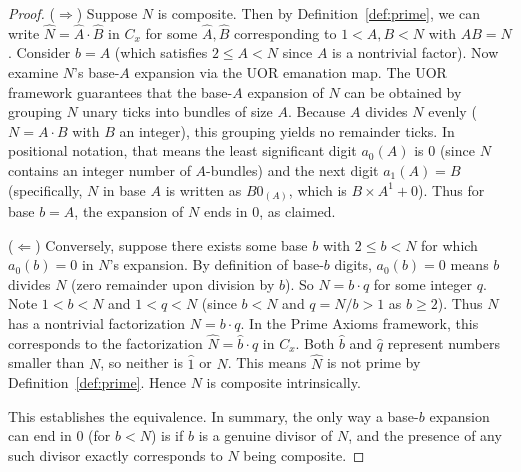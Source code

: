 \documentclass[11pt]{article}
\begin{document}
\begin{proof}
($\Rightarrow$) Suppose $N$ is composite. Then by Definition~\ref{def:prime}, we can write $\hat{N} = \hat{A}\cdot \hat{B}$ in $C_x$ for some $\hat{A},\hat{B}$ corresponding to $1 < A, B < N$ with $AB=N$. Consider $b = A$ (which satisfies $2 \le A < N$ since $A$ is a nontrivial factor). Now examine $N$’s base-$A$ expansion via the UOR emanation map. The UOR framework guarantees that the base-$A$ expansion of $N$ can be obtained by grouping $N$ unary ticks into bundles of size $A$. Because $A$ divides $N$ evenly ($N = A \cdot B$ with $B$ an integer), this grouping yields no remainder ticks. In positional notation, that means the least significant digit $a_0(A)$ is 0 (since $N$ contains an integer number of $A$-bundles) and the next digit $a_1(A) = B$ (specifically, $N$ in base $A$ is written as $B0_{(A)}$, which is $B \times A^1 + 0$). Thus for base $b=A$, the expansion of $N$ ends in 0, as claimed.

($\Leftarrow$) Conversely, suppose there exists some base $b$ with $2 \le b < N$ for which $a_0(b) = 0$ in $N$’s expansion. By definition of base-$b$ digits, $a_0(b)=0$ means $b$ divides $N$ (zero remainder upon division by $b$). So $N = b \cdot q$ for some integer $q$. Note $1 < b < N$ and $1 < q < N$ (since $b< N$ and $q = N/b > 1$ as $b\ge2$). Thus $N$ has a nontrivial factorization $N = b \cdot q$. In the Prime Axioms framework, this corresponds to the factorization $\hat{N} = \widehat{b}\cdot \hat{q}$ in $C_x$. Both $\widehat{b}$ and $\hat{q}$ represent numbers smaller than $N$, so neither is $\hat{1}$ or $\hat{N}$. This means $\hat{N}$ is not prime by Definition~\ref{def:prime}. Hence $N$ is composite intrinsically.

This establishes the equivalence. In summary, the only way a base-$b$ expansion can end in 0 (for $b < N$) is if $b$ is a genuine divisor of $N$, and the presence of any such divisor exactly corresponds to $N$ being composite.
\end{proof}
\end{document}
